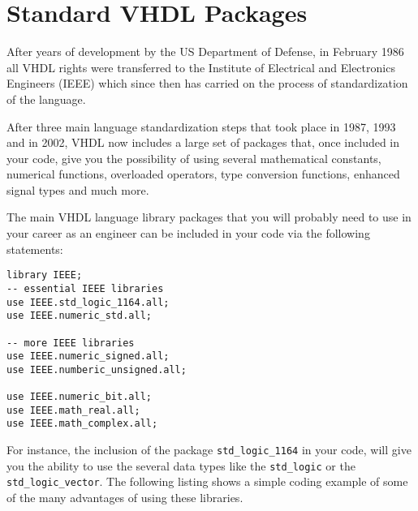 \null\newpage
\thispagestyle{empty}
\mbox{}

\chapter{Standard VHDL Packages}
After years of development by the US Department of Defense, in February 1986 all VHDL rights were transferred to the Institute of Electrical and Electronics Engineers (IEEE) which since then has carried on the process of standardization of the language. 

After three main language standardization steps that took place in 1987, 1993 and in 2002, VHDL now includes a large set of packages that, once included in your code, give you the possibility of using several mathematical constants, numerical functions, overloaded operators, type conversion functions, enhanced signal types and much more.

The main VHDL language library packages that you will probably need to use in your career as an engineer can be included in your code via the following statements:

{\scriptsize
\begin{verbatim}
library IEEE;
-- essential IEEE libraries
use IEEE.std_logic_1164.all;
use IEEE.numeric_std.all;

-- more IEEE libraries
use IEEE.numeric_signed.all;
use IEEE.numberic_unsigned.all;

use IEEE.numeric_bit.all;
use IEEE.math_real.all;
use IEEE.math_complex.all;
\end{verbatim}
}

For instance, the inclusion of the package \texttt{std\_logic\_1164} in your code, will give you the ability to use the several data types like the \texttt{std\_logic} or the \texttt{std\_logic\_vector}. The following listing shows a simple coding example of some of the many advantages of using these libraries.


